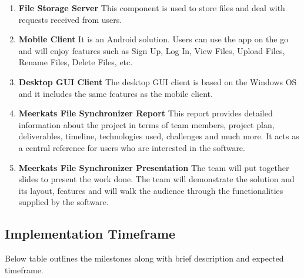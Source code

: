 \documentclass{article}
\begin{document}
\begin{enumerate}

  \item \textbf{File Storage Server} This component is used to store files and deal with requests received from users.
  \item \textbf{Mobile Client} It is an Android solution. Users can use the app on the go and will enjoy features such as Sign Up, Log In, View Files, Upload Files, Rename Files, Delete Files, etc.
  \item \textbf{Desktop GUI Client} The desktop GUI client is based on the Windows OS and it includes the same features as the mobile client.
  \item \textbf{Meerkats File Synchronizer Report} This report provides detailed information about the project in terms of team members, project plan, deliverables, timeline, technologies used, challenges and much more. It acts as a central reference for users who are interested in the software.
  \item \textbf{Meerkats File Synchronizer Presentation} The team will put together slides to present the work done. The team will demonstrate the solution and its layout, features and will walk the audience through the functionalities supplied by the software.

\end{enumerate}

\subsection{Implementation Timeframe}
Below table outlines the milestones along with brief description and expected timeframe.
\end{document}
